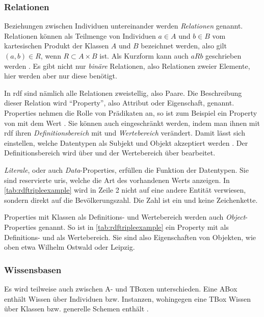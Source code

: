 \subsubsection{Relationen}
Beziehungen zwischen Individuen untereinander werden \emph{Relationen} genannt.
Relationen können als Teilmenge von Individuen $a \in A$ und $b \in B$ vom kartesischen Produkt der Klassen $A$ und $B$ bezeichnet werden, also gilt $(a,b) \in R$, wenn $R \subset A \times B$ ist.
Als Kurzform kann auch $aRb$ geschrieben werden \citep[S.~263]{semanticwebgrundlagen}.
Es gibt nicht nur \emph{binäre} Relationen, also Relationen zweier Elemente, hier werden aber nur diese benötigt.

In \ac{rdf} sind nämlich alle Relationen zweistellig, also Paare.
Die Beschreibung dieser Relation wird \enquote{Property}, also Attribut oder Eigenschaft, genannt.
Properties nehmen die Rolle von Prädikaten an, so ist zum Beispiel  ein Property von  mit dem Wert .
Sie können auch eingeschränkt werden, indem man ihnen mit \ac{rdf} ihren \emph{Definitionsbereich} mit und \emph{Wertebereich} verändert.
Damit lässt sich einstellen, welche Datentypen als Subjekt und Objekt akzeptiert werden \citep[S.~76]{semanticwebgrundlagen}.
Der Definitionsbereich wird über  und der Wertebereich über  bearbeitet.

\emph{Literale}, oder auch \emph{Data}-Properties, erfüllen die Funktion der Datentypen.
Sie sind reservierte \acp{uri}, welche die Art des vorhandenen Werts anzeigen.
In \cref{tab:rdftripleexample} wird in Zeile 2 nicht auf eine andere Entität verwiesen, sondern direkt auf die Bevölkerungszahl.
Die Zahl ist ein  und keine Zeichenkette.

Properties mit Klassen als Definitions- und Wertebereich werden auch \emph{Object}-Properties genannt.
So ist in \cref{tab:rdftripleexample}  ein Property mit  als Definitions- und  als Wertebereich.
Sie sind also Eigenschaften von Objekten, wie oben etwa Wilhelm Ostwald oder Leipzig.

\subsubsection{Wissensbasen}
Es wird teilweise auch zwischen A- und TBoxen unterschieden.
Eine ABox enthält Wissen über Individuen bzw. Instanzen, wohingegen eine TBox Wissen über Klassen bzw. generelle Schemen enthält \citep[S.~167]{semanticwebgrundlagen}.

